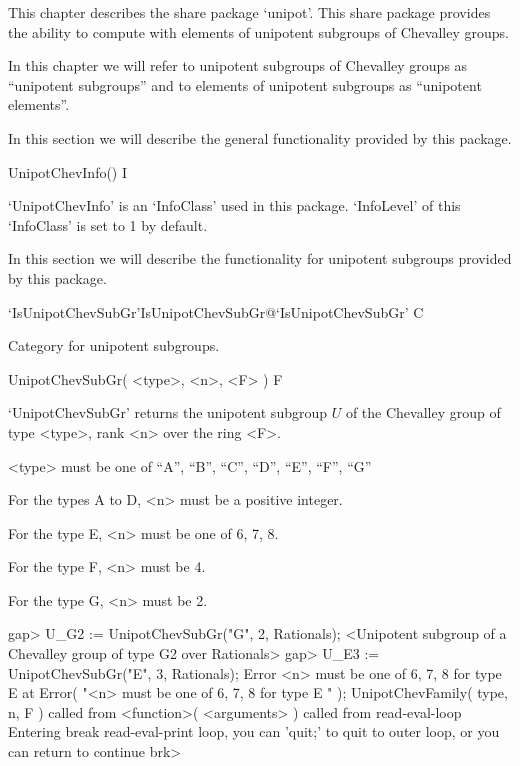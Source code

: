 

This chapter describes the share package `unipot'. This share package  
provides the ability to compute with elements of unipotent subgroups of 
Chevalley groups.

In this chapter we will refer to unipotent subgroups of Chevalley groups
as ``unipotent subgroups'' and to elements of unipotent subgroups as
``unipotent elements''. 



In this section we will describe the general functionality provided by
this package.

\>UnipotChevInfo() I

`UnipotChevInfo' is an `InfoClass' used in this package. `InfoLevel' of
this `InfoClass' is set to 1 by default.



In this section we will describe the functionality for unipotent
subgroups provided by this package.

\>`IsUnipotChevSubGr'{IsUnipotChevSubGr}@{`IsUnipotChevSubGr'} C

Category for unipotent subgroups.

\>UnipotChevSubGr( <type>, <n>, <F> ) F

`UnipotChevSubGr' returns the unipotent subgroup $U$ of the Chevalley group
of type <type>, rank <n> over the ring <F>.

<type> must be one of ``A'', ``B'', ``C'', ``D'', ``E'', ``F'', ``G''

For the types A to D, <n> must be a positive integer.

For the type E, <n> must be one of 6, 7, 8.

For the type F, <n> must be 4.

For the type G, <n> must be 2.

\beginexample
gap> U_G2 := UnipotChevSubGr("G", 2, Rationals);
<Unipotent subgroup of a Chevalley group of type G2 over Rationals>
\endexample
\begintt
gap> U_E3 := UnipotChevSubGr("E", 3, Rationals);
Error <n> must be one of 6, 7, 8 for type E  at
Error( "<n> must be one of 6, 7, 8 for type E " );
UnipotChevFamily( type, n, F ) called from
<function>( <arguments> ) called from read-eval-loop
Entering break read-eval-print loop, you can 'quit;' to quit to outer loop,
or you can return to continue
brk>
\endtt

